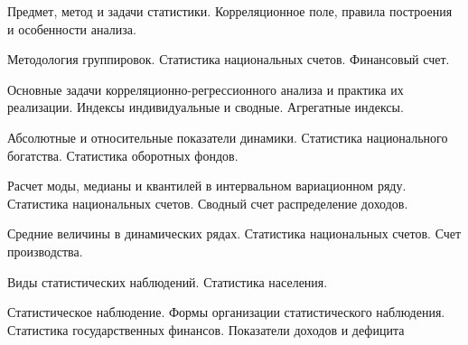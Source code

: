 


\shapkFull
\setcounter{zad}{0}

\z Предмет, метод и задачи статистики.
 \medskip
\z Корреляционное поле, правила построения и особенности анализа.
 \medskip

\newpage


\shapkFull
\setcounter{zad}{0}

\z Методология группировок.
 \medskip
\z Статистика национальных счетов. Финансовый счет.
 \medskip

\newpage


\shapkFull
\setcounter{zad}{0}

\z Основные задачи корреляционно-регрессионного анализа и практика их реализации.
 \medskip
\z Индексы индивидуальные и сводные. Агрегатные индексы.
 \medskip

\newpage


\shapkFull
\setcounter{zad}{0}

\z Абсолютные и относительные показатели динамики.
 \medskip
\z Статистика национального богатства. Статистика оборотных фондов.
 \medskip

\newpage


\shapkFull
\setcounter{zad}{0}

\z Расчет моды, медианы и квантилей в интервальном вариационном ряду.
 \medskip
\z Статистика национальных счетов. Сводный счет распределение доходов.
 \medskip

\newpage


\shapkFull
\setcounter{zad}{0}

\z Средние величины в динамических рядах.
 \medskip
\z Статистика национальных счетов. Счет производства.
 \medskip

\newpage


\shapkFull
\setcounter{zad}{0}

\z Виды статистических наблюдений.
 \medskip
\z Статистика населения.
 \medskip

\newpage


\shapkFull
\setcounter{zad}{0}

\z Статистическое наблюдение. Формы организации статистического наблюдения.
 \medskip
\z Статистика государственных финансов. Показатели доходов и дефицита
 \medskip

